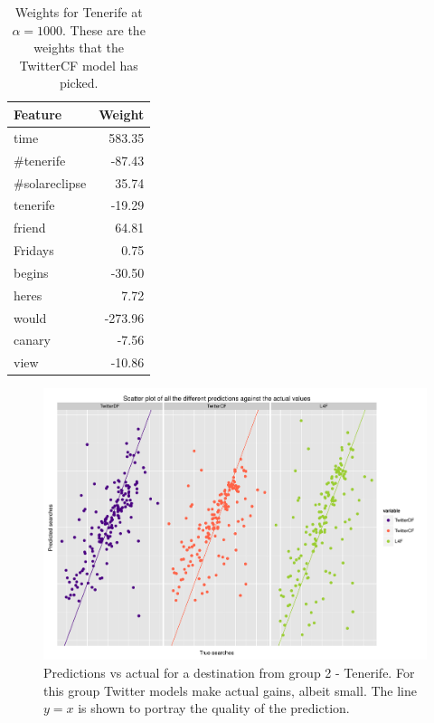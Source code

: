 \documentclass[minf,twoside,singlespacing,parskip,frontabs,notimes,11pt]{infthesis}
\begin{document}
\begin{table}[]
\begin{center}
\begin{tabular}{l | r}
Feature & Weight \\
\hline
time & 583.35 \\
\#tenerife & -87.43 \\
\#solareclipse & 35.74\\
tenerife & -19.29\\
friend & 64.81\\
Fridays & 0.75\\
begins & -30.50\\
heres & 7.72\\
would & -273.96\\
canary & -7.56\\
view & -10.86 \\
\end{tabular}
\end{center}
\caption{Weights for Tenerife at $\alpha=1000$. These are the weights that the TwitterCF model has picked.}
\end{table}




\begin{figure}[]
\begin{center}
\includegraphics[scale=0.5]{plots/Tenerife}
\end{center}
\caption{Predictions vs actual for a destination from group 2 - Tenerife. For this group Twitter models make actual gains, albeit small. The line $y = x$ is shown to portray the quality of the prediction.}
\end{figure}
\end{document}

